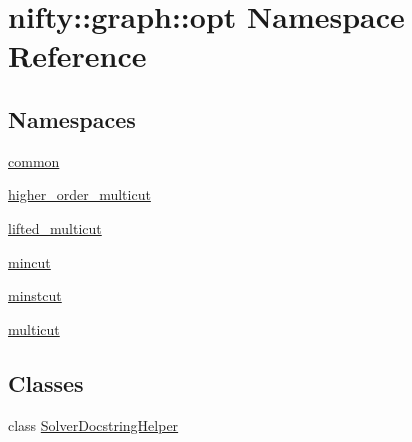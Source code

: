 \hypertarget{namespacenifty_1_1graph_1_1opt}{}\section{nifty\+:\+:graph\+:\+:opt Namespace Reference}
\label{namespacenifty_1_1graph_1_1opt}
\subsection*{Namespaces}
\begin{DoxyCompactItemize}
\item 
 \hyperlink{namespacenifty_1_1graph_1_1opt_1_1common}{common}
\item 
 \hyperlink{namespacenifty_1_1graph_1_1opt_1_1higher__order__multicut}{higher\+\_\+order\+\_\+multicut}
\item 
 \hyperlink{namespacenifty_1_1graph_1_1opt_1_1lifted__multicut}{lifted\+\_\+multicut}
\item 
 \hyperlink{namespacenifty_1_1graph_1_1opt_1_1mincut}{mincut}
\item 
 \hyperlink{namespacenifty_1_1graph_1_1opt_1_1minstcut}{minstcut}
\item 
 \hyperlink{namespacenifty_1_1graph_1_1opt_1_1multicut}{multicut}
\end{DoxyCompactItemize}
\subsection*{Classes}
\begin{DoxyCompactItemize}
\item 
class \hyperlink{classnifty_1_1graph_1_1opt_1_1SolverDocstringHelper}{Solver\+Docstring\+Helper}
\end{DoxyCompactItemize}
